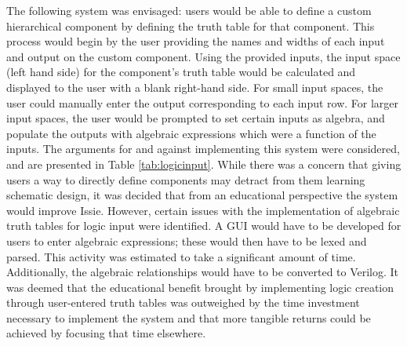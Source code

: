 The following system was envisaged: users would be able to define a custom hierarchical component by defining the truth table for that component. This process would begin by the user providing the names and widths of each input and output on the custom component. Using the provided inputs, the input space (left hand side) for the component's truth table would be calculated and displayed to the user with a blank right-hand side. For small input spaces, the user could manually enter the output corresponding to each input row. For larger input spaces, the user would be prompted to set certain inputs as algebra, and populate the outputs with algebraic expressions which were a function of the inputs. The arguments for and against implementing this system were considered, and are presented in Table \ref{tab:logicinput}. While there was a concern that giving users a way to directly define components may detract from them learning schematic design, it was decided that from an educational perspective the system would improve Issie. However, certain issues with the implementation of algebraic truth tables for logic input were identified. A GUI would have to be developed for users to enter algebraic expressions; these would then have to be lexed and parsed. This activity was estimated to take a significant amount of time. Additionally, the algebraic relationships would have to be converted to Verilog. It was deemed that the educational benefit brought by implementing logic creation through user-entered truth tables was outweighed by the time investment necessary to implement the system and that more tangible returns could be achieved by focusing that time elsewhere.

